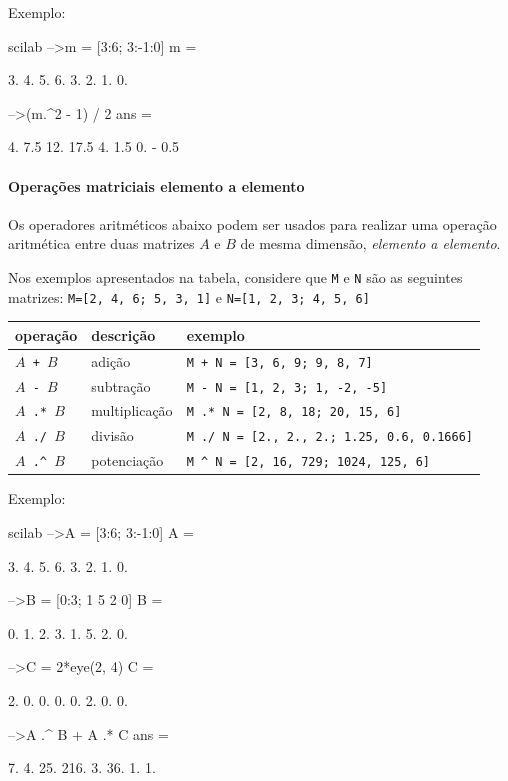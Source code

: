 \documentclass[11pt,fleqn]{practice}
\begin{document}
Exemplo:
\begin{lst}{scilab}
-->m = [3:6; 3:-1:0]
 m  =
 
    3.    4.    5.    6.  
    3.    2.    1.    0.  
 
-->(m.^2 - 1) / 2
 ans  =
 
    4.    7.5    12.    17.5  
    4.    1.5    0.   - 0.5
\end{lst}

\paragraph{Operações matriciais elemento a elemento}

Os operadores aritméticos abaixo podem ser usados para realizar uma
operação aritmética entre duas matrizes $A$ e $B$ de mesma dimensão,
\emph{elemento a elemento}.

Nos exemplos apresentados na tabela, considere que \texttt{M} e
\texttt{N} são as seguintes matrizes: \texttt{M=[2, 4, 6; 5, 3, 1]} e
\texttt{N=[1, 2, 3; 4, 5, 6]}

\begin{center}
  \begin{tabular}{llp{9cm}} \hline
    \textbf{operação} & \textbf{descrição} & \textbf{exemplo}\\\hline
    \texttt{$A$ + $B$} & adição & \texttt{M + N = [3, 6, 9; 9, 8, 7]}\\\hline
    \texttt{$A$ - $B$} & subtração & \texttt{M - N = [1, 2, 3; 1, -2, -5]} \\\hline
    \texttt{$A$ .* $B$} & multiplicação & \texttt{M .* N = [2, 8, 18; 20, 15, 6]}\\\hline
    \texttt{$A$ ./ $B$} & divisão & \texttt{M ./ N = [2., 2., 2.; 1.25, 0.6, 0.1666]}\\\hline
    \texttt{$A$ .\textasciicircum\ $B$} & potenciação & \texttt{M \textasciicircum\ N = [2, 16, 729; 1024, 125, 6]} \\\hline
  \end{tabular}
\end{center}

Exemplo:
\begin{lst}{scilab}
-->A = [3:6; 3:-1:0]
 A  =
 
    3.    4.    5.    6.  
    3.    2.    1.    0.  
 
-->B = [0:3; 1 5 2 0]
 B  =
 
    0.    1.    2.    3.  
    1.    5.    2.    0.  

-->C = 2*eye(2, 4)
 C  =
 
    2.    0.    0.    0.  
    0.    2.    0.    0.  
  
-->A .^ B + A .* C
 ans  =
 
    7.    4.     25.    216.  
    3.    36.    1.     1.    
\end{lst}
\end{document}
